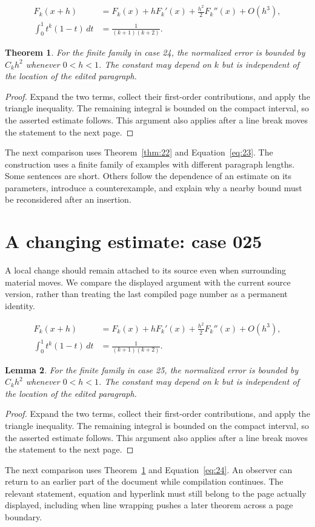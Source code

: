 \documentclass[a4paper,10pt]{article}
\newtheorem{theorem}{Theorem}[section]
\newtheorem{lemma}[theorem]{Lemma}
\begin{document}
\lipsum[10-11]
\begin{align}\label{eq:23}
 F_k(x+h)&=F_k(x)+hF_k'(x)+\frac{h^2}{2}F_k''(x)+O(h^3),\\
 \int_0^1 t^k(1-t)\,dt&=\frac{1}{(k+1)(k+2)}.
\end{align}
\begin{theorem}\label{thm:23}
For the finite family in case 24, the normalized error is bounded by $C_k h^2$ whenever $0<h<1$. The constant may depend on $k$ but is independent of the location of the edited paragraph.
\end{theorem}
\begin{proof}
Expand the two terms, collect their first-order contributions, and apply the
triangle inequality. The remaining integral is bounded on the compact interval,
so the asserted estimate follows. This argument also applies after a line break
moves the statement to the next page.
\end{proof}
The next comparison uses Theorem~\ref{thm:22} and Equation~\ref{eq:23}. The construction uses a finite family of examples with different paragraph lengths. Some sentences are short. Others follow the dependence of an estimate on its parameters, introduce a counterexample, and explain why a nearby bound must be reconsidered after an insertion.

\lipsum[18]

\section{A changing estimate: case 025}\label{unit:24}
A local change should remain attached to its source even when surrounding material moves. We compare the displayed argument with the current source version, rather than treating the last compiled page number as a permanent identity.

\lipsum[13-14]
\begin{align}\label{eq:24}
 F_k(x+h)&=F_k(x)+hF_k'(x)+\frac{h^2}{2}F_k''(x)+O(h^3),\\
 \int_0^1 t^k(1-t)\,dt&=\frac{1}{(k+1)(k+2)}.
\end{align}
\begin{lemma}\label{thm:24}
For the finite family in case 25, the normalized error is bounded by $C_k h^2$ whenever $0<h<1$. The constant may depend on $k$ but is independent of the location of the edited paragraph.
\end{lemma}
\begin{proof}
Expand the two terms, collect their first-order contributions, and apply the
triangle inequality. The remaining integral is bounded on the compact interval,
so the asserted estimate follows. This argument also applies after a line break
moves the statement to the next page.
\end{proof}
The next comparison uses Theorem~\ref{thm:23} and Equation~\ref{eq:24}. An observer can return to an earlier part of the document while compilation continues. The relevant statement, equation and hyperlink must still belong to the page actually displayed, including when line wrapping pushes a later theorem across a page boundary.
\end{document}
